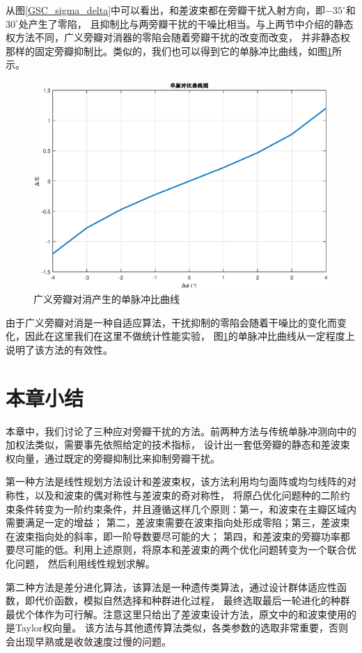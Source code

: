 \documentclass[master]{thesis-uestc}
\begin{document}
从图\ref{GSC_sigma_delta}中可以看出，和差波束都在旁瓣干扰入射方向，即$-35^\circ$和$30^\circ$处产生了零陷，
且抑制比与两旁瓣干扰的干噪比相当。与上两节中介绍的静态权方法不同，广义旁瓣对消器的零陷会随着旁瓣干扰的改变而改变，
并非静态权那样的固定旁瓣抑制比。类似的，我们也可以得到它的单脉冲比曲线，如图\ref{GSC_MRC}所示。
\begin{figure}[H]
    \includegraphics[scale=0.5]{pic/GSC_MRC.eps}
    \caption{广义旁瓣对消产生的单脉冲比曲线}
    \label{GSC_MRC}
\end{figure}

由于广义旁瓣对消是一种自适应算法，干扰抑制的零陷会随着干噪比的变化而变化，因此在这里我们在这里不做统计性能实验，
图\ref{GSC_MRC}的单脉冲比曲线从一定程度上说明了该方法的有效性。

\section{本章小结}
本章中，我们讨论了三种应对旁瓣干扰的方法。前两种方法与传统单脉冲测向中的加权法类似，需要事先依照给定的技术指标，
设计出一套低旁瓣的静态和差波束权向量，通过既定的旁瓣抑制比来抑制旁瓣干扰。

第一种方法是线性规划方法设计和差波束权，该方法利用均匀面阵或均匀线阵的对称性，以及和波束的偶对称性与差波束的奇对称性，
将原凸优化问题种的二阶约束条件转变为一阶约束条件，并且遵循这样几个原则：第一，和波束在主瓣区域内需要满足一定的增益；
第二，差波束需要在波束指向处形成零陷；第三，差波束在波束指向处的斜率，即一阶导数要尽可能的大；
第四，和差波束的旁瓣功率都要尽可能的低。利用上述原则，将原本和差波束的两个优化问题转变为一个联合优化问题，
然后利用线性规划求解。

第二种方法是差分进化算法，该算法是一种遗传类算法，通过设计群体适应性函数，即代价函数，模拟自然选择和种群进化过程，
最终选取最后一轮进化的种群最优个体作为可行解。注意这里只给出了差波束设计方法，原文中的和波束使用的是Taylor权向量。
该方法与其他遗传算法类似，各类参数的选取非常重要，否则会出现早熟或是收敛速度过慢的问题。
\end{document}
